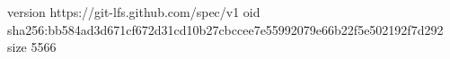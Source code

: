version https://git-lfs.github.com/spec/v1
oid sha256:bb584ad3d671cf672d31cd10b27cbccee7e55992079e66b22f5e502192f7d292
size 5566
